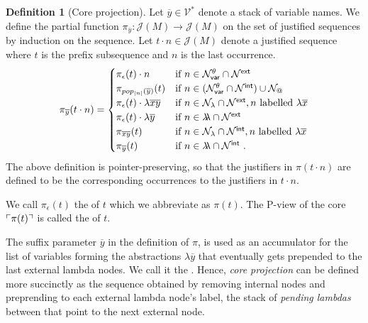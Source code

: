 \documentclass{article}
\makeatletter
\theoremstyle{plain}
\theoremstyle{definition}
\newtheorem{definition}{Definition}[section]
\theoremstyle{remark}
\newcommand\VarSet{\mathcal{V}}
\newcommand\Nodes{\mathcal{N}}%
\newcommand\NodesVar{\Nodes_{\sf var}}%
\newcommand\NodesLmd{\Nodes_\lambda}%
\newcommand\NodesApp{\Nodes_@}%
\newcommand{\ghostlmd}{{\lambda\!\!\lambda}}
\newcommand{\ghostvar}{\theta}
\newcommand\ImNodesVar{\NodesVar^\ghostvar}
\def\coresymbol{\pi} %
\newcommand{\core}[1]{\coresymbol(#1)} %
\newcommand{\ExtNodes}{\Nodes^{\sf ext}}
\newcommand{\IntNodes}{\Nodes^{\sf int}}
\def\justseqset{\mathcal{J}}
\makeatother
\begin{document}
\begin{definition}[Core projection]
\label{def:coreprojection}
Let $\overline{y} \in \VarSet^*$ denote a stack of variable names.
We define the partial function $\coresymbol_{\overline{y}}\colon \justseqset(M) \longrightarrow \justseqset(M)$ on the set of justified sequences by induction on the sequence.
Let $t \cdot n\in\justseqset(M)$ denote a justified sequence where $t$ is the prefix subsequence and $n$ is the last occurrence.
\begin{equation*}
\coresymbol_{\overline{y}}(t\cdot n) =
\begin{cases}
\coresymbol_{\epsilon}(t) \cdot n
    & \mbox{if } n\in\ImNodesVar\inter\ExtNodes \\
\coresymbol_{pop_{|n|}(\overline{y})}(t)
    & \mbox{if } n\in(\ImNodesVar\inter\IntNodes)\union\NodesApp \\
\coresymbol_{\epsilon}(t) \cdot \lambda \overline{x}\overline{y}
    & \mbox{if } n\in\NodesLmd\inter\ExtNodes, n \mbox{ labelled } \lambda\overline{x}\\
\coresymbol_{\epsilon}(t) \cdot\lambda\overline{y}
    & \mbox{if } n\in\ghostlmd\inter\ExtNodes \\
\coresymbol_{\overline{x} \overline{y}}(t)
    & \mbox{if } n\in\NodesLmd\inter\IntNodes, n \mbox{ labelled } \lambda\overline{x} \\
\coresymbol_{\overline{y}}(t)
    & \mbox{if } n\in\ghostlmd\inter\IntNodes \ .
\end{cases}
\end{equation*}
The above definition is pointer-preserving, so that the justifiers in $\coresymbol(t\cdot n)$ are defined to be the corresponding occurrences to the justifiers in $t \cdot n$.

We call $\coresymbol_\epsilon(t)$ the  of $t$ which we abbreviate as $\core{t}$. The P-view of the core $\pview{\core{t}}$ is called the  of $t$.
\end{definition}

The suffix parameter $\overline{y}$ in the definition of $\coresymbol$, is used as an accumulator for the list of variables forming the abstractions $\lambda \overline{y}$ that eventually gets prepended to the last external lambda nodes. We call it the . Hence, \emph{core projection} can be defined more succinctly as the sequence obtained by removing internal nodes and preprending to each external lambda node's label, the stack of \emph{pending lambdas} between that point to the next external node.
\end{document}
